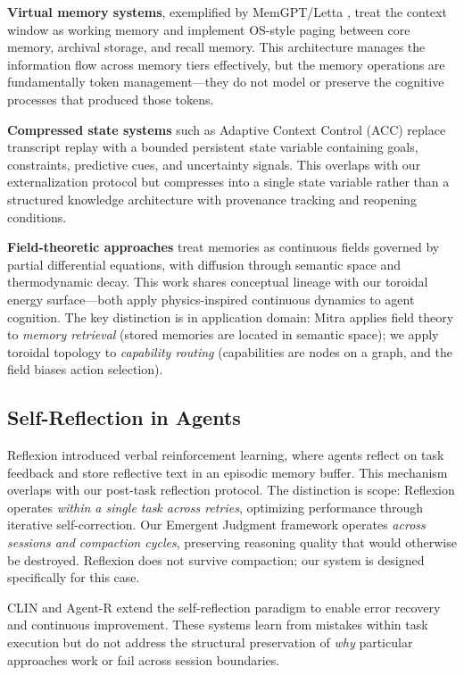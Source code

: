 \documentclass[11pt,a4paper]{article}
\begin{document}
\textbf{Virtual memory systems}, exemplified by MemGPT/Letta
\citep{packer2023memgpt}, treat the context window as working memory
and implement OS-style paging between core memory, archival storage,
and recall memory. This architecture manages the information flow
across memory tiers effectively, but the memory operations are
fundamentally token management---they do not model or preserve the
cognitive processes that produced those tokens.

\textbf{Compressed state systems} such as Adaptive Context Control
(ACC) \citep{acc2026} replace transcript replay with a bounded
persistent state variable containing goals, constraints, predictive
cues, and uncertainty signals. This overlaps with our externalization
protocol but compresses into a single state variable rather than a
structured knowledge architecture with provenance tracking and
reopening conditions.

\textbf{Field-theoretic approaches} \citep{mitra2026field} treat
memories as continuous fields governed by partial differential
equations, with diffusion through semantic space and thermodynamic
decay. This work shares conceptual lineage with our toroidal energy
surface---both apply physics-inspired continuous dynamics to agent
cognition. The key distinction is in application domain: Mitra applies
field theory to \emph{memory retrieval} (stored memories are located
in semantic space); we apply toroidal topology to \emph{capability
routing} (capabilities are nodes on a graph, and the field biases
action selection).

\subsection{Self-Reflection in Agents}

Reflexion \citep{shinn2023reflexion} introduced verbal reinforcement
learning, where agents reflect on task feedback and store reflective
text in an episodic memory buffer. This mechanism overlaps with our
post-task reflection protocol. The distinction is scope:
Reflexion operates \emph{within a single task across retries},
optimizing performance through iterative self-correction. Our
Emergent Judgment framework operates \emph{across sessions and
compaction cycles}, preserving reasoning quality that would otherwise
be destroyed. Reflexion does not survive compaction; our system is
designed specifically for this case.

CLIN \citep{clin2024} and Agent-R \citep{agent_r2025} extend the
self-reflection paradigm to enable error recovery and continuous
improvement. These systems learn from mistakes within task execution
but do not address the structural preservation of \emph{why} particular
approaches work or fail across session boundaries.
\end{document}
